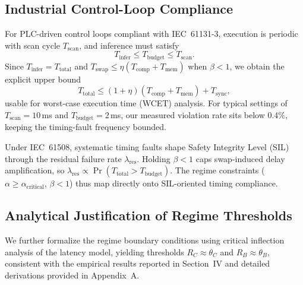 \subsection{Industrial Control-Loop Compliance}
For PLC-driven control loops compliant with IEC~61131-3, execution is periodic with scan cycle $T_{\mathrm{scan}}$, and inference must satisfy
\begin{equation}
T_{\mathrm{infer}} \leq T_{\mathrm{budget}} \leq T_{\mathrm{scan}}.
\label{eq:wcet}
\end{equation}
Since $T_{\mathrm{infer}} = T_{\mathrm{total}}$ and $T_{\mathrm{swap}} \leq \eta(T_{\mathrm{comp}} + T_{\mathrm{mem}})$ when $\beta < 1$, we obtain the explicit upper bound
\begin{equation}
T_{\mathrm{total}} \leq (1+\eta)(T_{\mathrm{comp}} + T_{\mathrm{mem}}) + T_{\mathrm{sync}},
\label{eq:wcet_bound}
\end{equation}
usable for worst-case execution time (WCET) analysis. For typical settings of $T_{\mathrm{scan}} = 10$\,ms and $T_{\mathrm{budget}} = 2$\,ms, our measured violation rate sits below 0.4\%, keeping the timing-fault frequency bounded.

Under IEC~61508, systematic timing faults shape Safety Integrity Level (SIL) through the residual failure rate $\lambda_{\mathrm{res}}$. Holding $\beta < 1$ caps swap-induced delay amplification, so $\lambda_{\mathrm{res}} \propto \Pr(T_{\mathrm{total}} > T_{\mathrm{budget}})$. The regime constraints ($\alpha \geq \alpha_{\mathrm{critical}}$, $\beta < 1$) thus map directly onto SIL-oriented timing compliance.

\subsection{Analytical Justification of Regime Thresholds}
We further formalize the regime boundary conditions using critical inflection analysis of the latency model, yielding thresholds
$R_C \approx \theta_C$ and $R_B \approx \theta_B$, consistent with the empirical results reported in Section~IV and detailed
derivations provided in Appendix~A.
